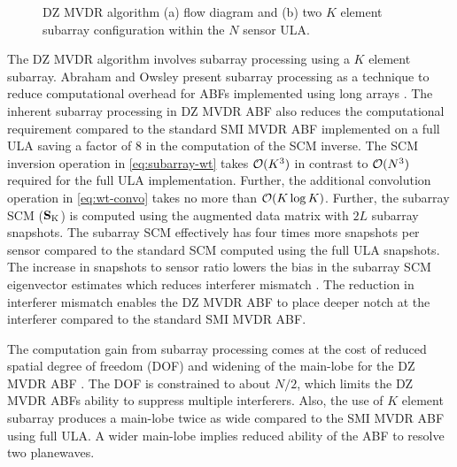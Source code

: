 \begin{figure}[!ht]
  \centering

  \vfil


  \caption[DZ MVDR algorithm flow diagram]{DZ MVDR algorithm (a) flow diagram and (b) two $K$ element
    subarray configuration within the $N$ sensor ULA.}
  \label{fig:dzmvdr}
\end{figure}

The DZ MVDR algorithm involves subarray processing using a $K$ element
subarray. Abraham and Owsley present subarray processing as a
technique to reduce computational overhead for ABFs implemented using
long arrays \cite{abraham89preproc}. The inherent subarray processing
in DZ MVDR ABF also reduces the computational requirement compared to the
standard SMI MVDR ABF implemented on a full ULA saving a factor of 8
in the computation of the SCM inverse. The SCM inversion operation in
\eqref{eq:subarray-wt} takes $\mathcal{O}(K^3)$ in contrast to $\mathcal{O}(N^3)$
required for the full ULA implementation. Further, the additional
convolution operation in \eqref{eq:wt-convo} takes no more than
$\mathcal{O}(K \operatorname{log} K)$. Further, the subarray SCM
(${\bf S}_{\rm K}$) is computed using the augmented data matrix with
$2L$ subarray snapshots. The subarray SCM effectively has four times
more snapshots per sensor compared to the standard SCM computed using
the full ULA snapshots. The increase in snapshots to sensor ratio
lowers the bias in the subarray SCM eigenvector estimates which reduces
interferer mismatch \cite{benaych2011eigen, paul2007asymptotics}. The reduction in interferer mismatch enables the DZ MVDR ABF to place deeper notch at the interferer compared to the standard SMI MVDR ABF. 

The computation gain from subarray processing comes at the cost of
reduced spatial degree of freedom (DOF) and widening of the main-lobe
for the DZ MVDR ABF \cite{abraham89preproc}. The DOF is constrained to
about $N/2$, which limits the DZ MVDR ABFs ability to suppress
multiple interferers. Also, the use of $K$ element subarray produces a
main-lobe twice as wide compared to the SMI MVDR ABF using full ULA. A wider main-lobe implies reduced ability of the ABF to resolve two planewaves.

